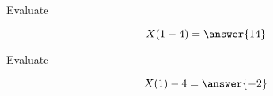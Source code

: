 \documentclass{ximera}
\begin{document}
\begin{exercise}
\begin{question}


Evaluate  

\[
X(1-4) = \answer{14}
\]


\end{question}








\begin{question}


Evaluate  

\[
X(1)-4 = \answer{-2}
\]


\end{question}










\end{exercise}
\end{document}
